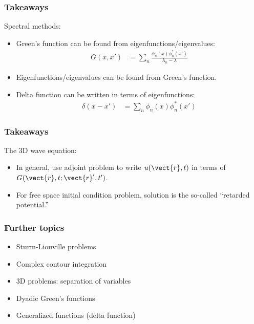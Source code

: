 \documentclass[12 pt, compress, handout, intlimits]{beamer}
\begin{document}
\begin{frame}[fragile]
    \frametitle{Takeaways}
    
    Spectral methods:
    \begin{itemize}
    \item
        Green's function can be found from eigenfunctions/eigenvalues:
        \begin{align*}
            G(x,x') &= \sum_n \frac{\phi_n(x) \phi_n^*(x')}{\lambda_n - \lambda}
        \end{align*}
    \item
        Eigenfunctions/eigenvalues can be found from Green's function.
    \item
        Delta function can be written in terms of eigenfunctions:
        \begin{align*}
            \delta(x - x') &= \sum_n \phi_n(x) \phi_n^*(x')
        \end{align*}
    \end{itemize}
    

\end{frame}

\note{}

\ifextended
\begin{frame}[fragile]
    \frametitle{Takeaways}
    
    The 3D wave equation:
    \begin{itemize}
    \item
        In general, use adjoint problem to write $ u(\vect{r}, t) $ in terms of $ G(\vect{r}, t; \vect{r}', t') $.
    \item
        For free space initial condition problem, solution is the so-called ``retarded potential.''
    \end{itemize}
    
\end{frame}

\note{}
\fi

\begin{frame}[fragile]
    \frametitle{Further topics}

    \begin{itemize}
    \item
        Sturm-Liouville problems
    \item
        Complex contour integration
    \item
        3D problems: separation of variables
    \item
        Dyadic Green's functions
    \ifextended
    \else
    \item
        Generalized functions (delta function)
    \fi
    \end{itemize}
    
\end{frame}
\end{document}
